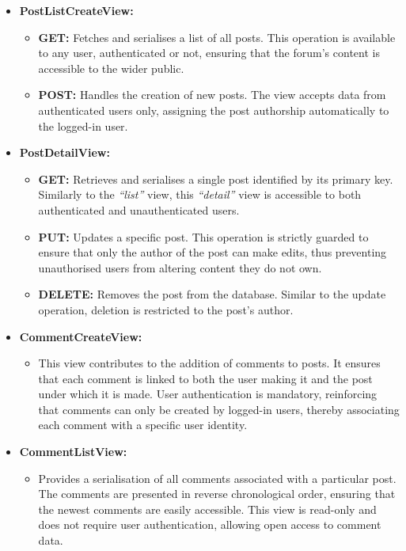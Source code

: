\begin{itemize}
    \item \textbf{PostListCreateView:}
    \begin{itemize}
        \item \textbf{GET:} Fetches and serialises a list of all posts. This operation is available to any user, authenticated or not, ensuring that the forum's content is accessible to the wider public.
        \item \textbf{POST:} Handles the creation of new posts. The view accepts data from authenticated users only, assigning the post authorship automatically to the logged-in user. 
    \end{itemize}

    \item \textbf{PostDetailView:}
    \begin{itemize}
        \item \textbf{GET:} Retrieves and serialises a single post identified by its primary key. Similarly to the \textit{``list''} view, this \textit{``detail''} view is accessible to both authenticated and unauthenticated users.
        \item \textbf{PUT:} Updates a specific post. This operation is strictly guarded to ensure that only the author of the post can make edits, thus preventing unauthorised users from altering content they do not own.
        \item \textbf{DELETE:} Removes the post from the database. Similar to the update operation, deletion is restricted to the post's author.
    \end{itemize}

    \item \textbf{CommentCreateView:}
    \begin{itemize}
        \item This view contributes to the addition of comments to posts. It ensures that each comment is linked to both the user making it and the post under which it is made. User authentication is mandatory, reinforcing that comments can only be created by logged-in users, thereby associating each comment with a specific user identity.
    \end{itemize}

    \item \textbf{CommentListView:}
    \begin{itemize}
        \item Provides a serialisation of all comments associated with a particular post. The comments are presented in reverse chronological order, ensuring that the newest comments are easily accessible. This view is read-only and does not require user authentication, allowing open access to comment data.
    \end{itemize}


\end{itemize}
